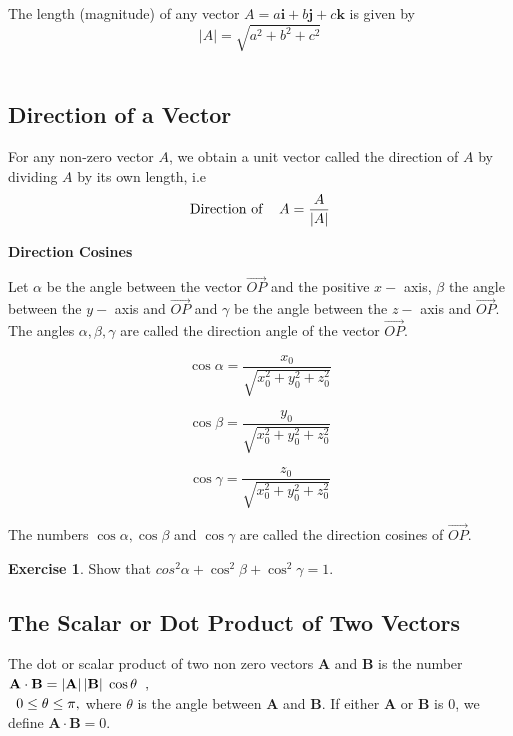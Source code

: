 \documentclass[11pt,a4paper]{article}
\theoremstyle{definition}
\newtheorem{exe}[thm]{Exercise}
\newcommand{\subhead}[1]{%
  \par\medskip\noindent\textbf{#1}\par\nobreak\smallskip}
\begin{document}
The length (magnitude) of any vector $A = a\textbf{i} +  b\textbf{j} +  c\textbf{k}$ is given by $$\left|A\right| = \sqrt{a^2 + b^2 + c^2}$$\\

\subsection{Direction of a Vector}
For any non-zero vector $A$, we obtain a unit vector called the direction of $A$ by dividing $A$ by its own length, i.e $$\text{Direction of }\hspace{0.3cm} A = \frac{A}{
\left|A\right|
}$$


\subhead{Direction Cosines}


Let $\alpha$ be the angle between the vector $\overrightarrow{OP}$ and the positive $x -$ axis, $\beta$ the angle between the $y - $ axis and $\overrightarrow{OP}$ and $\gamma$ be the angle between the $z - $ axis and $\overrightarrow{OP}$. The angles $\alpha, \beta, \gamma$ are called the direction angle of the vector $\overrightarrow{OP}$.

$$\cos \alpha = \frac{x_0}{\sqrt{x_0^2 + y_0^2 + z_0^2}}$$

$$\cos \beta = \frac{y_0}{\sqrt{x_0^2 + y_0^2 + z_0^2}}$$

$$\cos \gamma = \frac{z_0}{\sqrt{x_0^2 + y_0^2 + z_0^2}}$$

The numbers $\cos \alpha, \cos \beta$ and $\cos \gamma$ are called the direction cosines of $\overrightarrow{OP}$.


\begin{exe}


Show that $cos^2 \alpha + \cos^2 \beta + \cos^2 \gamma = 1$.
\end{exe}


\subsection{The Scalar or Dot Product of Two Vectors}
The dot or scalar product of two non zero vectors \textbf{A} and \textbf{B} is the number $\textbf{A}\cdot\textbf{B} = \left|\textbf{A}\right|\left|\textbf{B}\right|\hspace{0.1cm}\cos \theta\hspace{0.2cm},$\\$ \hspace{0.2cm} 0 \leq \theta \leq \pi,$ where $\theta$ is the angle between $\textbf{A}$ and $\textbf{B}$. If either $\textbf{A}$ or $\textbf{B}$ is 0, we define $\textbf{A}\cdot \textbf{B}  = 0$.\\\\
\end{document}
